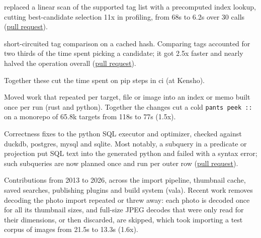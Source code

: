 



\begin{bullets}
    \item {}replaced a linear scan of the supported tag list with a precomputed index lookup, cutting best-candidate selection 11x in profiling, from 68s to 6.2s over 30 calls (\href{https://github.com/pypa/pip/pull/9748}{pull request}).
    \item {}short-circuited tag comparison on a cached hash. Comparing tags accounted for two thirds of the time spent picking a candidate; it got 2.5x faster and nearly halved the operation overall (\href{https://github.com/pypa/packaging/pull/417}{pull request}).
\end{bullets}
Together these cut the time spent on pip steps in ci (at Kensho).

Moved work that repeated per target, file or image into an index or memo built once per run (rust and python). Together the changes cut a cold \mbox{\texttt{pants peek ::}} on a monorepo of {\mytilde}65.8k targets from 118s to 77s (1.5x).

Correctness fixes to the python SQL executor and optimizer, checked against duckdb, postgres, mysql and sqlite. Most notably, a subquery in a predicate or projection put SQL text into the generated python and failed with a syntax error; such subqueries are now planned once and run per outer row (\href{https://github.com/tobymao/sqlglot/pull/8190}{pull request}).

Contributions from 2013 to 2026, across the import pipeline, thumbnail cache, saved searches, publishing plugins and build system (vala).
Recent work removes decoding the photo import repeated or threw away: each photo is decoded once for all its thumbnail sizes, and full-size JPEG decodes that were only read for their dimensions, or then discarded, are skipped, which took importing a test corpus of images from 21.5s to 13.3s (1.6x).


